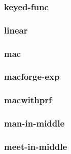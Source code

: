 \begin{frame} \frametitle{keyed-func}
\begin{figure}
\begin{center}

\end{center}
\end{figure}
\end{frame}
\begin{frame} \frametitle{linear}
\begin{figure}
\begin{center}

\end{center}
\end{figure}
\end{frame}
\begin{frame} \frametitle{mac}
\begin{figure}
\begin{center}

\end{center}
\end{figure}
\end{frame}
\begin{frame} \frametitle{macforge-exp}
\begin{figure}
\begin{center}

\end{center}
\end{figure}
\end{frame}
\begin{frame} \frametitle{macwithprf}
\begin{figure}
\begin{center}

\end{center}
\end{figure}
\end{frame}
\begin{frame} \frametitle{man-in-middle}
\begin{figure}
\begin{center}

\end{center}
\end{figure}
\end{frame}
\begin{frame} \frametitle{meet-in-middle}
\begin{figure}
\begin{center}

\end{center}
\end{figure}
\end{frame}
